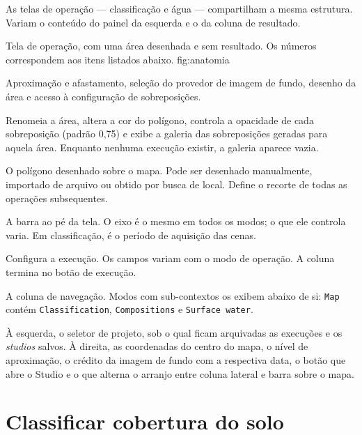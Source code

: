 \documentclass[12pt,a4paper]{article}
\begin{document}
As telas de opera\c{c}\~ao --- classifica\c{c}\~ao e \'agua ---
compartilham a mesma estrutura. Variam o conte\'udo do painel da esquerda e o
da coluna de resultado.

  {Tela de opera\c{c}\~ao, com uma \'area desenhada e sem resultado. Os
   n\'umeros correspondem aos itens listados abaixo.}
  {fig:anatomia}

 Aproxima\c{c}\~ao e afastamento, sele\c{c}\~ao
do provedor de imagem de fundo, desenho da \'area e acesso \`a
configura\c{c}\~ao de sobreposi\c{c}\~oes.

 Renomeia a \'area, altera a cor do
pol\'igono, controla a opacidade de cada sobreposi\c{c}\~ao (padr\~ao 0,75) e
exibe a galeria das sobreposi\c{c}\~oes geradas para aquela \'area. Enquanto
nenhuma execu\c{c}\~ao existir, a galeria aparece vazia.

 O pol\'igono desenhado sobre o mapa. Pode
ser desenhado manualmente, importado de arquivo ou obtido por busca de local.
Define o recorte de todas as opera\c{c}\~oes subsequentes.

 A barra ao p\'e da tela. O eixo \'e o mesmo em
todos os modos; o que ele controla varia. Em classifica\c{c}\~ao, \'e o
per\'iodo de aquisi\c{c}\~ao das cenas.

 Configura a execu\c{c}\~ao. Os campos
variam com o modo de opera\c{c}\~ao. A coluna termina no bot\~ao de
execu\c{c}\~ao.

 A coluna de navega\c{c}\~ao. Modos com
sub-contextos os exibem abaixo de si: \texttt{Map} cont\'em
\texttt{Classification}, \texttt{Compositions} e \texttt{Surface water}.

 \`A esquerda, o seletor de projeto, sob o qual
ficam arquivadas as execu\c{c}\~oes e os \emph{studios} salvos. \`A direita, as
coordenadas do centro do mapa, o n\'ivel de aproxima\c{c}\~ao, o cr\'edito da
imagem de fundo com a respectiva data, o bot\~ao que abre o Studio e o que
alterna o arranjo entre coluna lateral e barra sobre o mapa.

\section{Classificar cobertura do solo}
\end{document}

